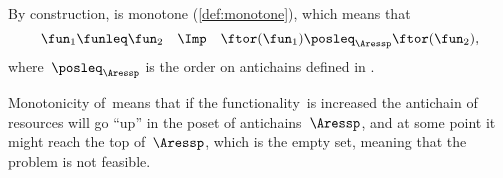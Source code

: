 
By construction, \ftor is monotone (\cref{def:monotone}), which means that
\[
  \fun_{1}\funleq\fun_{2}\quad\Imp\quad\ftor(\fun_{1})\posleq_{\Aressp}\ftor(\fun_{2}),
\]
where~$\posleq_{\Aressp}$ is the order on antichains defined in
\XXX.


Monotonicity of~\ftor means that if the functionality~\fun is increased the antichain of resources will go ``up'' in the poset of antichains~$\Aressp$, and at some point it might reach the top of~$\Aressp$, which is the empty set, meaning that the problem is not feasible.



